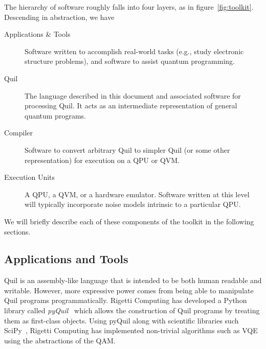 \documentclass[conference]{IEEEtran}
\begin{document}
The hierarchy of software roughly falls into four layers, as in figure~\ref{fig:toolkit}. Descending in abstraction, we have
\begin{description}
\item[Applications \& Tools] Software written to accomplish real-world tasks (e.g., study electronic structure problems), and software to assist quantum programming.
\item[Quil] The language described in this document and associated software for processing Quil. It acts as an intermediate representation of general quantum programs.
\item[Compiler] Software to convert arbitrary Quil to simpler Quil (or some other representation) for execution on a QPU or QVM.
\item[Execution Units] A QPU, a QVM, or a hardware emulator. Software written at this level will typically incorporate noise models intrinsic to a particular QPU.
\end{description}
We will briefly describe each of these components of the toolkit in the following sections.

\subsection{Applications and Tools}\label{sec:tools}
Quil is an assembly-like language that is intended to be both human readable and writable. However, more expressive power comes from being able to manipulate Quil programs programmatically. Rigetti Computing has developed a Python library called \emph{pyQuil}~\cite{pyQuil} which allows the construction of Quil programs by treating them as first-class objects. Using pyQuil along with scientific libraries such SciPy~\cite{SciPy}, Rigetti Computing has implemented non-trivial algorithms such as VQE using the abstractions of the QAM.
\end{document}
